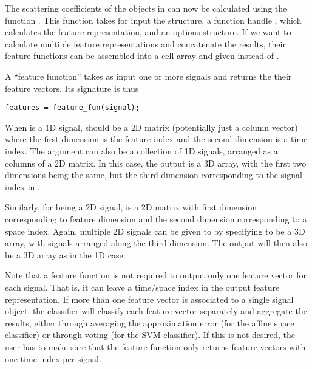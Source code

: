 \documentclass{article}
\begin{document}
The scattering coefficients of the objects in  can now be calculated using the function . This function takes for input the  structure, a function handle , which calculates the feature representation, and an options structure. If we want to calculate multiple feature representations and concatenate the results, their feature functions can be assembled into a cell array and given instead of .

A ``feature function'' takes as input one or more signals and returns the their feature vectors. Its signature is thus
\begin{lstlisting}
features = feature_fun(signal);
\end{lstlisting}

When  is a 1D signal,  should be a 2D matrix (potentially just a column vector) where the first dimension is the feature index and the second dimension is a time index. The  argument can also be a collection of 1D signals, arranged as a columns of a 2D matrix. In this case, the output  is a 3D array, with the first two dimensions being the same, but the third dimension corresponding to the signal index in .

Similarly, for  being a 2D signal,  is a 2D matrix with first dimension corresponding to feature dimension and the second dimension corresponding to a space index. Again, multiple 2D signals can be given to  by specifying  to be a 3D array, with signals arranged along the third dimension. The output  will then also be a 3D array as in the 1D case.

Note that a feature function is not required to output only one feature vector for each signal. That is, it can leave a time/space index in the output feature representation. If more than one feature vector is associated to a single signal object, the classifier will classify each feature vector separately and aggregate the results, either through averaging the approximation error (for the affine space classifier) or through voting (for the SVM classifier). If this is not desired, the user has to make sure that the feature function only returns feature vectors with one time index per signal.
\end{document}
